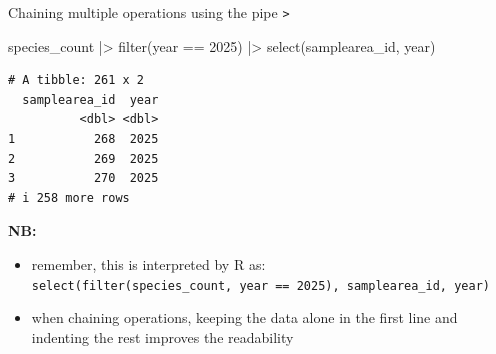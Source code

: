 \documentclass[
  ignorenonframetext,
  aspectratio=169,
]{beamer}
\newenvironment{Shaded}{\begin{snugshade}}{\end{snugshade}}
\newcommand{\DecValTok}[1]{\textcolor[rgb]{0.68,0.00,0.00}{#1}}
\newcommand{\FunctionTok}[1]{\textcolor[rgb]{0.28,0.35,0.67}{#1}}
\newcommand{\NormalTok}[1]{\textcolor[rgb]{0.00,0.23,0.31}{#1}}
\newcommand{\SpecialCharTok}[1]{\textcolor[rgb]{0.37,0.37,0.37}{#1}}
\providecommand{\tightlist}{%
  \setlength{\itemsep}{0pt}\setlength{\parskip}{0pt}}
\let\oldtexttt\texttt
\renewcommand{\texttt}[1]{\colorbox{gray!20}{\oldtexttt{#1}}}
\begin{document}
\begin{frame}[fragile]{Chaining multiple operations using the pipe
\texttt{\textbar{}\textgreater{}}}
\protect{}\label{chaining-multiple-operations-using-the-pipe}
\footnotesize

\begin{Shaded}
\begin{Highlighting}[]
\NormalTok{species\_count }\SpecialCharTok{|\textgreater{}} 
    \FunctionTok{filter}\NormalTok{(year }\SpecialCharTok{==} \DecValTok{2025}\NormalTok{) }\SpecialCharTok{|\textgreater{}} 
    \FunctionTok{select}\NormalTok{(samplearea\_id, year)}
\end{Highlighting}
\end{Shaded}

\begin{verbatim}
# A tibble: 261 x 2
  samplearea_id  year
          <dbl> <dbl>
1           268  2025
2           269  2025
3           270  2025
# i 258 more rows
\end{verbatim}

\normalsize

\pause

\textbf{NB:}

\begin{itemize}
\tightlist
\item
  remember, this is interpreted by R as:
  \texttt{select(filter(species\_count,\ year\ ==\ 2025),\ samplearea\_id,\ year)}
\item
  when chaining operations, keeping the data alone in the first line and
  indenting the rest improves the readability
\end{itemize}
\end{frame}
\end{document}
